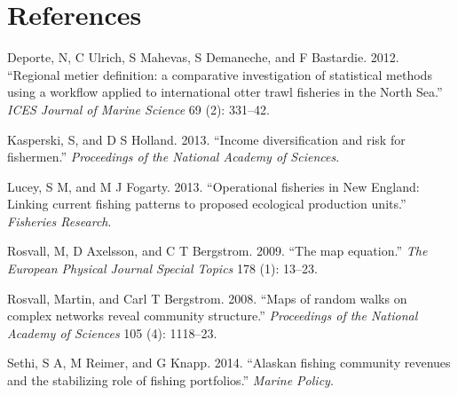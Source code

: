 \documentclass[]{article}
\begin{document}
\section*{References}\label{references}

Deporte, N, C Ulrich, S Mahevas, S Demaneche, and F Bastardie. 2012.
``Regional metier definition: a comparative investigation of statistical
methods using a workflow applied to international otter trawl fisheries
in the North Sea.'' \emph{ICES Journal of Marine Science} 69 (2):
331--42.

Kasperski, S, and D S Holland. 2013. ``Income diversification and risk
for fishermen.'' \emph{Proceedings of the National Academy of Sciences}.

Lucey, S M, and M J Fogarty. 2013. ``Operational fisheries in New
England: Linking current fishing patterns to proposed ecological
production units.'' \emph{Fisheries Research}.

Rosvall, M, D Axelsson, and C T Bergstrom. 2009. ``The map equation.''
\emph{The European Physical Journal Special Topics} 178 (1): 13--23.

Rosvall, Martin, and Carl T Bergstrom. 2008. ``Maps of random walks on
complex networks reveal community structure.'' \emph{Proceedings of the
National Academy of Sciences} 105 (4): 1118--23.

Sethi, S A, M Reimer, and G Knapp. 2014. ``Alaskan fishing community
revenues and the stabilizing role of fishing portfolios.'' \emph{Marine
Policy}.
\end{document}
